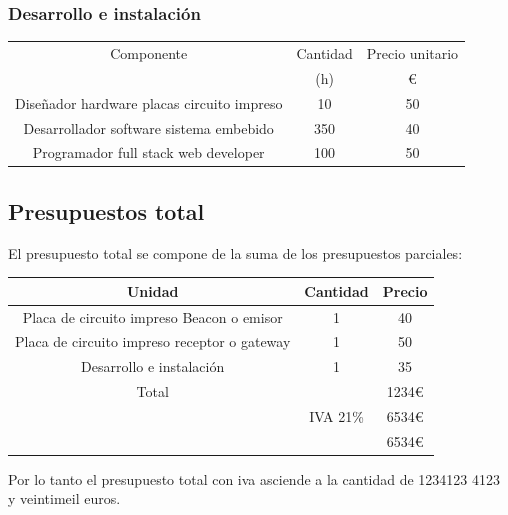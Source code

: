 \documentclass[paper=a4, fontsize=11pt,twoside]{scrartcl}	%
\begin{document}
            \subsubsection{Desarrollo e instalación}
            \begin{center}
                \begin{tabular}{||c | c |c ||} 
                \hline
                Componente & Cantidad  & Precio unitario  \\ [0.5ex] 
                 & (h) & € \\ [0.5ex] 
                \hline\hline
                    Diseñador hardware placas circuito impreso   & 10  & 50 \\ 
                    Desarrollador  software sistema embebido     & 350 & 40 \\ 
                    Programador full stack web developer         & 100 & 50 \\ 
                \hline
                \end{tabular}
            \end{center}
    \subsection{Presupuestos total}
        El presupuesto total se compone de la suma de los presupuestos parciales:
        \begin{center}
            \begin{tabular}{||c | c |c ||} 
            \hline
            Unidad & Cantidad & Precio  \\ [0.5ex] 
            \hline\hline
            Placa de circuito impreso Beacon o emisor & 1 & 40 \\ 
            Placa de circuito impreso receptor o gateway & 1 & 50 \\ 
            Desarrollo e instalación & 1 & 35 \\ 
            \hline
            \hline
            Total &  & 1234€ \\ 
             & IVA 21\%& 6534€ \\ 
             & & 6534€ \\ 
            \hline
            \end{tabular}
        \end{center}
        Por lo tanto el presupuesto total con iva asciende a la cantidad de 1234123 4123 y veintimeil euros.
\end{document}
